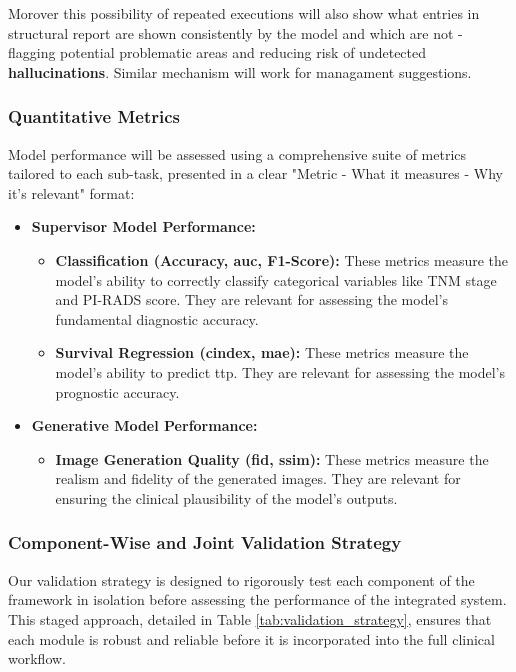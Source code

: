 \documentclass[11pt, a4paper]{article}
\begin{document}
Morover this possibility of repeated executions will also show what entries in structural report are shown consistently by the model and which are not - flagging potential problematic areas and reducing risk of undetected \textbf{hallucinations}.  Similar mechanism will work for managament suggestions. 

\subsubsection{Quantitative Metrics}
Model performance will be assessed using a comprehensive suite of metrics tailored to each sub-task, presented in a clear "Metric - What it measures - Why it's relevant" format:
\begin{itemize}
    \item \textbf{Supervisor Model Performance:}
        \begin{itemize}
            \item \textbf{Classification (Accuracy, \gls{auc}, F1-Score):} These metrics measure the model's ability to correctly classify categorical variables like TNM stage and PI-RADS score. They are relevant for assessing the model's fundamental diagnostic accuracy.
            \item \textbf{Survival Regression (\gls{cindex}, \gls{mae}):} These metrics measure the model's ability to predict \gls{ttp}. They are relevant for assessing the model's prognostic accuracy.
        \end{itemize}
    \item \textbf{Generative Model Performance:}
        \begin{itemize}
            \item \textbf{Image Generation Quality (\gls{fid}, \gls{ssim}):} These metrics measure the realism and fidelity of the generated images. They are relevant for ensuring the clinical plausibility of the model's outputs.

        \end{itemize}
\end{itemize}

\subsubsection{Component-Wise and Joint Validation Strategy}
Our validation strategy is designed to rigorously test each component of the framework in isolation before assessing the performance of the integrated system. This staged approach, detailed in Table \ref{tab:validation_strategy}, ensures that each module is robust and reliable before it is incorporated into the full clinical workflow.
\end{document}
